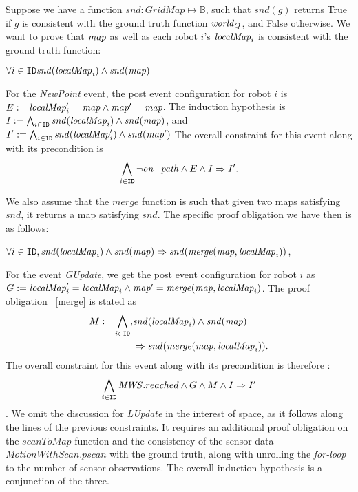 Suppose we have a function $\mathit{snd}: GridMap \mapsto \mathbb{B}$, such that $\mathit{snd}(g)$ returns True if $g$ is consistent with the ground truth function $\mathit{world}_Q$, and False otherwise. We want to prove that $\mathit{map}$ as well as each robot $i$'s $\mathit{localMap}_i$ is consistent with the ground truth function:
\begin{invariant}
    \label{inv:mapping}
    $\forall i \in \texttt{ID} \mathit{snd(\mathit{localMap}_i)} \wedge \mathit{snd(\mathit{map})}$
\end{invariant}

For the \emph{NewPoint} event, the post event configuration for robot $i$ is $E:= \mathit{localMap}_i' = \mathit{map} \wedge \mathit{map}' = \mathit{map}$.
The induction hypothesis is $I:= \bigwedge_{i\in \texttt{ID}} \mathit{snd}(\mathit{localMap}_i) \wedge \mathit{snd}(\mathit{map})$, and $I':= \bigwedge_{i\in \texttt{ID}} \mathit{snd}(\mathit{localMap}_i') \wedge \mathit{snd}(\mathit{map}')$ The overall constraint for this event along with its precondition is $$\bigwedge_{i\in \texttt{ID}}\neg\mathit{on\_path}\wedge E\wedge I\Rightarrow I'.$$

We also assume that the $\mathit{merge}$ function is such that given two maps satisfying $\mathit{snd}$, it returns a map satisfying $\mathit{snd}$. The specific proof obligation we have then is as follows:
\begin{proofob}
    \label{merge}
    $\forall i \in \texttt{ID}, \mathit{snd(\mathit{localMap}_i)}\wedge \mathit{snd(\mathit{map})}\Rightarrow \mathit{snd(merge(\mathit{map},\mathit{localMap}_i))}$,
\end{proofob}

For the event \emph{GUpdate}, we get the post event configuration for robot $i$ as $G:= \mathit{localMap}_i' = \mathit{localMap}_i \wedge \mathit{map}' = \mathit{merge}(\mathit{map},\mathit{localMap}_i)$. The proof obligation ~\ref{merge} is stated as \begin{align*}M:= \bigwedge_{i\in \texttt{ID}}, &\mathit{snd(\mathit{localMap}_i)}\wedge \mathit{snd(\mathit{map})}\\ &\Rightarrow \mathit{snd(merge(\mathit{map},\mathit{localMap}_i)).}\end{align*} The overall constraint for this event along with its precondition is therefore : $$\bigwedge_{i\in \texttt{ID}} \mathit{MWS}.reached \wedge G \wedge M \wedge I \Rightarrow I'$$. We omit the discussion for \emph{LUpdate} in the interest of space, as it follows along the lines of the previous constraints. It requires an additional proof obligation on the $\mathit{scanToMap}$ function and the consistency of the sensor data $\mathit{MotionWithScan.pscan}$ with the ground truth, along with unrolling the \emph{for-loop} to the number of sensor observations. The overall induction hypothesis is a conjunction of the three.

